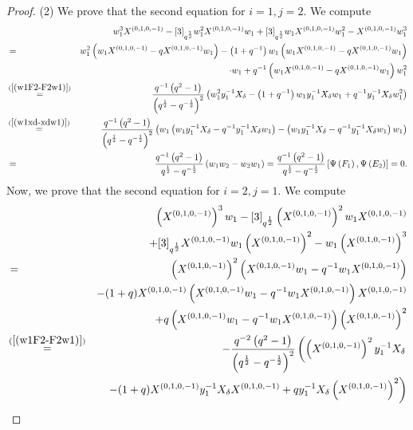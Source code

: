 \documentclass[reqno,11pt]{amsart}
\numberwithin{equation}{section}
\begin{document}
\begin{proof}
(2) We prove that the second equation for $i=1, j=2$. We compute
\begin{eqnarray*}
	&& w_1^3 X^{(0,1,0,-1)}-[3]_{q^{\frac{1}{2}}} w_1^2 X^{(0,1,0,-1)} w_1+[3]_{q^{\frac{1}{2}}} w_1 X^{(0,1,0,-1)} w_1^2-X^{(0,1,0,-1)} w_1^3 \\
	& =&w_1^2\left(w_1 X^{(0,1,0,-1)}-q X^{(0,1,0,-1)} w_1\right)-\left(1+q^{-1}\right) w_1\left(w_1 X^{(0,1,0,-1)}-q X^{(0,1,0,-1)} w_1\right) \\
	&& \cdot w_1+q^{-1}\left(w_1 X^{(0,1,0,-1)}-q X^{(0,1,0,-1)} w_1\right) w_1^2\\
	&\mathop  = \limits^{(\ref{(w1F2-F2w1)})} &\frac{q^{-1}\left(q^2-1\right)}{\left(q^{\frac{1}{2}}-q^{-\frac{1}{2}}\right)^2}\left(w_1^2 y_1^{-1} X_\delta-\left(1+q^{-1}\right) w_1 y_1^{-1} X_\delta w_1+q^{-1} y_1^{-1} X_\delta w_1^2\right)\\
	&\mathop  = \limits^{(\ref{(w1xd-xdw1)})} & \frac{q^{-1}\left(q^2-1\right)}{\left(q^{\frac{1}{2}}-q^{-\frac{1}{2}}\right)^2}\left(w_1\left(w_1 y_1^{-1} X_\delta-q^{-1} y_1^{-1} X_\delta w_1\right)-\left(w_1 y_1^{-1} X_\delta-q^{-1} y_1^{-1} X_\delta w_1\right) w_1\right)\\
	&	=& \frac{q^{-1}\left(q^2-1\right)}{q^{\frac{1}{2}}-q^{-\frac{1}{2}}}\left(w_1 w_2-w_2 w_1\right)=\frac{q^{-1}\left(q^2-1\right)}{q^{\frac{1}{2}}-q^{-\frac{1}{2}}}\left[\Psi\left(F_1\right), \Psi\left(E_2\right)\right]=0.
\end{eqnarray*}
Now, we prove that the second equation for $i=2, j=1$. We compute
\begin{eqnarray*}
	&& \left(X^{(0,1,0,-1)}\right)^3 w_1-[3]_{q^{\frac{1}{2}}}\left(X^{(0,1,0,-1)}\right)^2 w_1 X^{(0,1,0,-1)} \\
	&& +[3]_{q^{\frac{1}{2}}} X^{(0,1,0,-1)} w_1\left(X^{(0,1,0,-1)}\right)^2-w_1\left(X^{(0,1,0,-1)}\right)^3 \\
	&= & \left(X^{(0,1,0,-1)}\right)^2\left(X^{(0,1,0,-1)} w_1-q^{-1} w_1 X^{(0,1,0,-1)}\right) \\
	&& -(1+q) X^{(0,1,0,-1)}\left(X^{(0,1,0,-1)} w_1-q^{-1} w_1 X^{(0,1,0,-1)}\right) X^{(0,1,0,-1)} \\
	&	& +q\left(X^{(0,1,0,-1)} w_1-q^{-1} w_1 X^{(0,1,0,-1)}\right)\left(X^{(0,1,0,-1)}\right)^2\\
	&\mathop  = \limits^{(\ref{(w1F2-F2w1)})}&-\frac{q^{-2}\left(q^2-1\right)}{\left(q^{\frac{1}{2}}-q^{-\frac{1}{2}}\right)^2}\left(\left(X^{(0,1,0,-1)}\right)^2 y_1^{-1} X_\delta\right.\\
	&& \left.-(1+q) X^{(0,1,0,-1)} y_1^{-1} X_\delta X^{(0,1,0,-1)}+q y_1^{-1} X_\delta\left(X^{(0,1,0,-1)}\right)^2\right) \\

\end{eqnarray*}
\end{proof}
\end{document}

